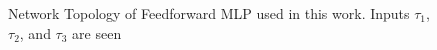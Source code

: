 \documentclass[twocolumn]{sagej}
\begin{document}
\begin{comment}
\begin{align}
\hat{r}_t = \lvert r_t \rvert \\
\tau_1 = MA_{\hat{r}_t} = \frac{1}{\omega_1}\hat{r}_{(t-\omega_1)} + \frac{1}{\omega_1}\hat{r}_{(t-\omega_1-1)} + \frac{1}{\omega_1}\hat{r}_{(t-\omega_1-2)} + \ldots + \nonumber \\
+ \frac{1}{\omega_1} + \hat{r}_{(t)} + \ldots + \frac{1}{\omega_1}\hat{r}_{(t+\omega_1-2)} + \frac{1}{\omega_1}\hat{r}_{(t+\omega_1-1)} + \frac{1}{\omega_1}\hat{r}_{(t+\omega_1)}\\
	\tau_2 = \textit{slope}(MA_{\hat{r}_t}) = MA_{\hat{r}_t} - MA_{\hat{r}_(t-\omega_2)}\\
	\tau_3 = \textit{slope}(MA_{\hat{p}_t}) = MA_{{p}_t} - MA_{{p}_(t-\omega_2)}
\end{align}
\end{comment}

\begin{figure}[htbp]
\centering
{}
 \label{fig:io_diagram}
 \caption{Network Topology of Feedforward MLP used in this work. Inputs $\tau_1$, $\tau_2$, and $\tau_3$ are seen}

\end{figure}
\end{document}

